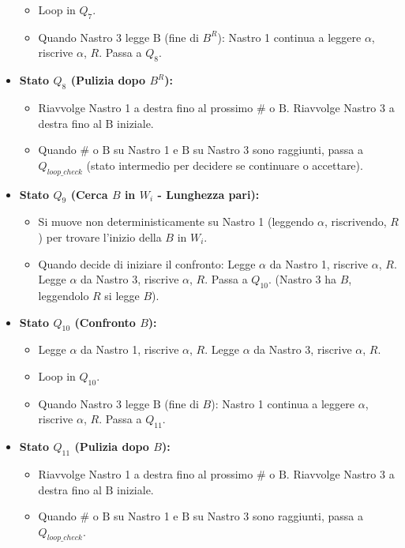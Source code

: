 \documentclass[a4paper]{article}
\newcommand{\B}{\text{B}} %
\begin{document}
\begin{itemize}
\begin{itemize}
            \item Loop in $Q_7$.
            \item Quando Nastro 3 legge $\B$ (fine di $B^R$): Nastro 1 continua a leggere $\alpha$, riscrive $\alpha$, $R$. Passa a $Q_8$.
        \end{itemize}
    \item \textbf{Stato $Q_8$ (Pulizia dopo $B^R$):}
        \begin{itemize}
            \item Riavvolge Nastro 1 a destra fino al prossimo $\#$ o $\B$. Riavvolge Nastro 3 a destra fino al $\B$ iniziale.
            \item Quando $\#$ o $\B$ su Nastro 1 e $\B$ su Nastro 3 sono raggiunti, passa a $Q_{loop\_check}$ (stato intermedio per decidere se continuare o accettare).
        \end{itemize}
    \item \textbf{Stato $Q_9$ (Cerca $B$ in $W_i$ - Lunghezza pari):}
        \begin{itemize}
            \item Si muove non deterministicamente su Nastro 1 (leggendo $\alpha$, riscrivendo, $R$) per trovare l'inizio della $B$ in $W_i$.
            \item Quando decide di iniziare il confronto: Legge $\alpha$ da Nastro 1, riscrive $\alpha$, $R$. Legge $\alpha$ da Nastro 3, riscrive $\alpha$, $R$. Passa a $Q_{10}$.
            (Nastro 3 ha $B$, leggendolo $R$ si legge $B$).
        \end{itemize}
    \item \textbf{Stato $Q_{10}$ (Confronto $B$):}
        \begin{itemize}
            \item Legge $\alpha$ da Nastro 1, riscrive $\alpha$, $R$. Legge $\alpha$ da Nastro 3, riscrive $\alpha$, $R$.
            \item Loop in $Q_{10}$.
            \item Quando Nastro 3 legge $\B$ (fine di $B$): Nastro 1 continua a leggere $\alpha$, riscrive $\alpha$, $R$. Passa a $Q_{11}$.
        \end{itemize}
    \item \textbf{Stato $Q_{11}$ (Pulizia dopo $B$):}
        \begin{itemize}
            \item Riavvolge Nastro 1 a destra fino al prossimo $\#$ o $\B$. Riavvolge Nastro 3 a destra fino al $\B$ iniziale.
            \item Quando $\#$ o $\B$ su Nastro 1 e $\B$ su Nastro 3 sono raggiunti, passa a $Q_{loop\_check}$.

\end{itemize}
\end{itemize}
\end{document}
